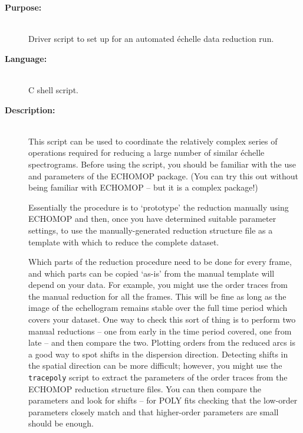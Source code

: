 \documentclass[twoside,11pt]{article}
\newcommand{\htmlref}[2]{#1}
\newcommand{\xref}[3]{#1}
\newcommand{\scspec}[2]{#1}
\newcommand{\scspec}[2]{#2}
\begin{document}
\begin{description}

\item [{\bf Purpose:}] \mbox{} \\
     Driver script to set up for an automated \'{e}chelle data reduction run.

\item [{\bf Language:}] \mbox{} \\
     C shell script.

\item [{\bf Description:}] \mbox{} \\
     This script can be used to coordinate the relatively complex
     series of operations required for reducing a large number of
     similar \'{e}chelle spectrograms.  Before using the script, you
     should be familiar with the use and parameters of the
     \xref{ECHOMOP}{sun152}{}
     package.  (You can try this out without being familiar with
     ECHOMOP \scspec{--}{-} but it is a complex package!)

     Essentially the procedure is to `prototype' the reduction
     manually using ECHOMOP and then, once you have determined
     suitable parameter settings, to use the manually-generated
     reduction structure file as a template with which to reduce
     the complete dataset.

     Which parts of the reduction procedure need to be done for every
     frame, and which parts can be copied `as-is' from the manual
     template will depend on your data.  For example, you might
     use the order traces from the manual reduction for all the
     frames.  This will be fine as long as the image of the echellogram
     remains stable over the full time period which covers your dataset.
     One way to check this sort of thing is to perform two manual
     reductions \scspec{--}{-} one from early in the time period covered,
     one from late \scspec{--}{-} and then compare the two.
     Plotting orders from the reduced
     arcs is a good way to spot shifts in the dispersion direction.
     Detecting shifts in the spatial direction can be more difficult;
     however, you might use the \htmlref{\texttt{tracepoly}}{se_tracepoly}
     script to extract the
     parameters of the order traces from the ECHOMOP reduction structure
     files.  You can then compare the parameters and look for shifts
     \scspec{--}{-} for POLY fits checking that the low-order parameters
     closely match and that higher-order parameters are small should be enough.


\end{description}
\end{document}
